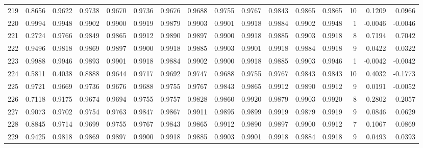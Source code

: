 \begin{tabular}{lrrrrrrrrrrrrrrr}
219 &      0.8656 &  0.9622 &  0.9738 &  0.9670 &  0.9736 &  0.9676 &  0.9688 &  0.9755 &  0.9767 &  0.9843 &   0.9865 &     0.9865 &     10 &                    0.1209 &                     0.0966 \\
220 &      0.9994 &  0.9948 &  0.9902 &  0.9900 &  0.9919 &  0.9879 &  0.9903 &  0.9901 &  0.9918 &  0.9884 &   0.9902 &     0.9948 &      1 &                   -0.0046 &                    -0.0046 \\
221 &      0.2724 &  0.9766 &  0.9849 &  0.9865 &  0.9912 &  0.9890 &  0.9897 &  0.9900 &  0.9918 &  0.9885 &   0.9903 &     0.9918 &      8 &                    0.7194 &                     0.7042 \\
222 &      0.9496 &  0.9818 &  0.9869 &  0.9897 &  0.9900 &  0.9918 &  0.9885 &  0.9903 &  0.9901 &  0.9918 &   0.9884 &     0.9918 &      9 &                    0.0422 &                     0.0322 \\
223 &      0.9988 &  0.9946 &  0.9893 &  0.9901 &  0.9918 &  0.9884 &  0.9902 &  0.9900 &  0.9918 &  0.9885 &   0.9903 &     0.9946 &      1 &                   -0.0042 &                    -0.0042 \\
224 &      0.5811 &  0.4038 &  0.8888 &  0.9644 &  0.9717 &  0.9692 &  0.9747 &  0.9688 &  0.9755 &  0.9767 &   0.9843 &     0.9843 &     10 &                    0.4032 &                    -0.1773 \\
225 &      0.9721 &  0.9669 &  0.9736 &  0.9676 &  0.9688 &  0.9755 &  0.9767 &  0.9843 &  0.9865 &  0.9912 &   0.9890 &     0.9912 &      9 &                    0.0191 &                    -0.0052 \\
226 &      0.7118 &  0.9175 &  0.9674 &  0.9694 &  0.9755 &  0.9757 &  0.9828 &  0.9860 &  0.9920 &  0.9879 &   0.9903 &     0.9920 &      8 &                    0.2802 &                     0.2057 \\
227 &      0.9073 &  0.9702 &  0.9754 &  0.9763 &  0.9847 &  0.9867 &  0.9911 &  0.9895 &  0.9899 &  0.9919 &   0.9879 &     0.9919 &      9 &                    0.0846 &                     0.0629 \\
228 &      0.8845 &  0.9714 &  0.9699 &  0.9755 &  0.9767 &  0.9843 &  0.9865 &  0.9912 &  0.9890 &  0.9897 &   0.9900 &     0.9912 &      7 &                    0.1067 &                     0.0869 \\
229 &      0.9425 &  0.9818 &  0.9869 &  0.9897 &  0.9900 &  0.9918 &  0.9885 &  0.9903 &  0.9901 &  0.9918 &   0.9884 &     0.9918 &      9 &                    0.0493 &                     0.0393 \\

\end{tabular}
